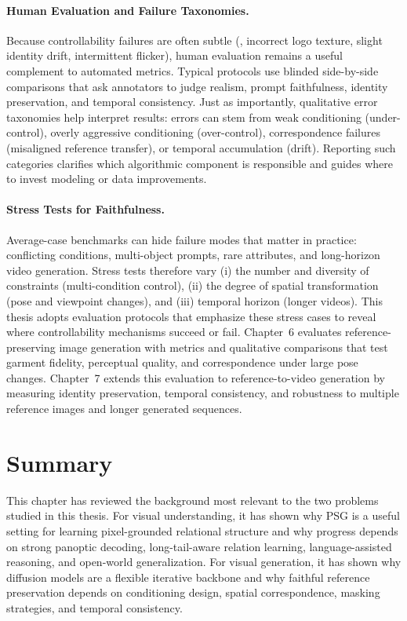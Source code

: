 \paragraph{Human Evaluation and Failure Taxonomies.}
Because controllability failures are often subtle (\eg, incorrect logo texture, slight identity drift, intermittent flicker), human evaluation remains a useful complement to automated metrics. Typical protocols use blinded side-by-side comparisons that ask annotators to judge realism, prompt faithfulness, identity preservation, and temporal consistency. Just as importantly, qualitative error taxonomies help interpret results: errors can stem from weak conditioning (under-control), overly aggressive conditioning (over-control), correspondence failures (misaligned reference transfer), or temporal accumulation (drift). Reporting such categories clarifies which algorithmic component is responsible and guides where to invest modeling or data improvements.

\paragraph{Stress Tests for Faithfulness.}
Average-case benchmarks can hide failure modes that matter in practice: conflicting conditions, multi-object prompts, rare attributes, and long-horizon video generation. Stress tests therefore vary (i) the number and diversity of constraints (multi-condition control), (ii) the degree of spatial transformation (pose and viewpoint changes), and (iii) temporal horizon (longer videos). This thesis adopts evaluation protocols that emphasize these stress cases to reveal where controllability mechanisms succeed or fail. Chapter~6 evaluates reference-preserving image generation with metrics and qualitative comparisons that test garment fidelity, perceptual quality, and correspondence under large pose changes. Chapter~7 extends this evaluation to reference-to-video generation by measuring identity preservation, temporal consistency, and robustness to multiple reference images and longer generated sequences.

\section{Summary}
This chapter has reviewed the background most relevant to the two problems studied in this thesis. For visual understanding, it has shown why PSG is a useful setting for learning pixel-grounded relational structure and why progress depends on strong panoptic decoding, long-tail-aware relation learning, language-assisted reasoning, and open-world generalization. For visual generation, it has shown why diffusion models are a flexible iterative backbone and why faithful reference preservation depends on conditioning design, spatial correspondence, masking strategies, and temporal consistency.

